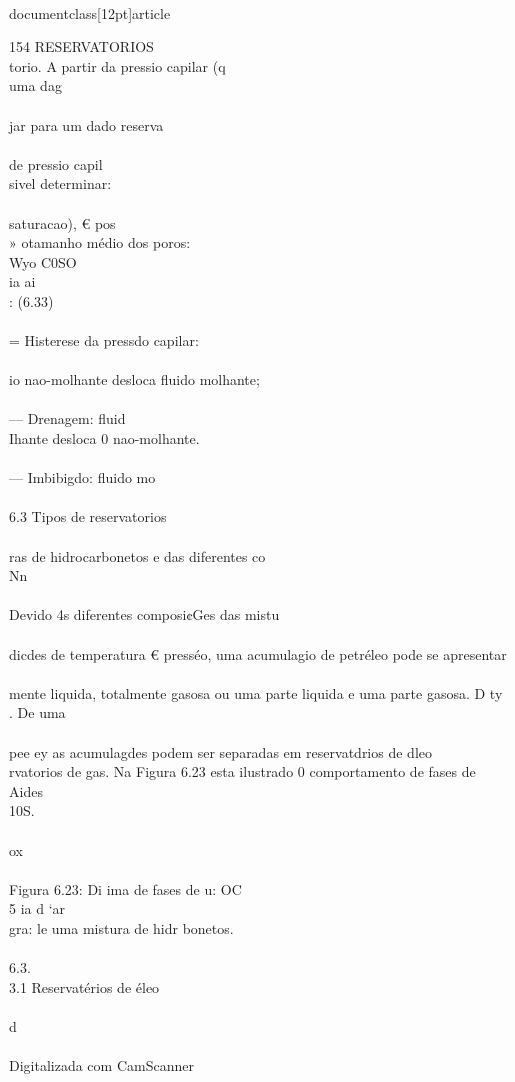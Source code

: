 \\documentclass[12pt]{article}
\begin{document}
154 RESERVATORIOS\\
torio. A partir da pressio capilar (q\\
uma dag\\
\\
jar para um dado reserva\\
\\
de pressio capil\\
sivel determinar:\\
\\
saturacao), € pos\\
» otamanho médio dos poros:\\
Wyo C0SO\\
ia ai\\
: (6.33)\\
\\
= Histerese da pressdo capilar:\\
\\
io nao-molhante desloca fluido molhante;\\
\\
— Drenagem: fluid\\
Ihante desloca 0 nao-molhante.\\
\\
— Imbibigdo: fluido mo\\
\\
6.3 Tipos de reservatorios\\
\\
ras de hidrocarbonetos e das diferentes co\\
Nn\\
\\
Devido 4s diferentes composi¢Ges das mistu\\
\\
dicdes de temperatura € presséo, uma acumulagio de petréleo pode se apresentar\\
\\
mente liquida, totalmente gasosa ou uma parte liquida e uma parte gasosa. D ty\\
. De uma\\
\\
pee ey as acumulagdes podem ser separadas em reservatdrios de dleo\\
rvatorios de gas. Na Figura 6.23 esta ilustrado 0 comportamento de fases de Aides\\
10S.\\
\\
ox\\
\\
Figura 6.23: Di ima de fases de u: OC\\
5 ia d ‘ar\\
gra: le uma mistura de hidr bonetos.\\
\\
6.3.\\
3.1 Reservatérios de éleo\\
\\
d\\
\\
Digitalizada com CamScanner\\
\end{document}
